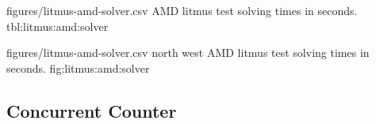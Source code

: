 

\SolverStatsTable
  {figures/litmus-amd-solver.csv}
  {\textnumero}
  {\AMDRowHeader}
  {AMD litmus test solving times in seconds.}
  {tbl:litmus:amd:solver}

\SolverStatsGraph
  {figures/litmus-amd-solver.csv}
  {north west}
  {AMD litmus test solving times in seconds.}
  {fig:litmus:amd:solver}

\newpage

\subsection*{Concurrent Counter}

\newcommand{\tikzmark}[1]{\tikz[overlay,remember picture] \node (#1) {};}
\newcommand*{\AddNote}[3]{%
  \begin{tikzpicture}[overlay, remember picture]
    \draw [decoration={brace,amplitude=0.5em},decorate,thick,red!60!black]
      ($(#1)!([yshift=1.5ex]#1)!($(#1)-(0,1)$)$) --
      ($(#1)!(#2)!($(#1)-(0,1)$)$)
      node [align=center, text width=1.0cm, pos=0.5, anchor=west] {\textsf{#3}};
  \end{tikzpicture}
}%


